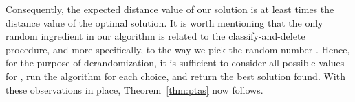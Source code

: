 \documentclass[11pt]{article}
\theoremstyle{plain}
\theoremstyle{definition}
\begin{document}
Consequently, the expected distance value of our solution is at least  times the distance value of the optimal solution. It is worth mentioning that the only random ingredient in our algorithm is related to the classify-and-delete procedure, and more specifically, to the way we pick the random number . Hence, for the purpose of derandomization, it is sufficient to consider all  possible values for , run the algorithm for each choice, and return the best solution found. With these observations in place, Theorem~\ref{thm:ptas} now follows.
\end{document}
